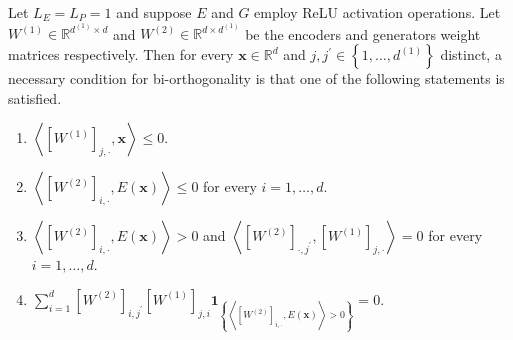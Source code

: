 \begin{corollary}
    Let $L_E=L_P=1$ and suppose $E$ and $G$ employ ReLU activation operations. Let $W^{(1)}\in\mathbb{R}^{d^{(1)}\times d}$ and $W^{(2)}\in\mathbb{R}^{d\times d^{(1)}}$ be the encoders and generators weight matrices respectively. Then for every $\mathbf{x}\in\mathbb{R}^d$ and $j,j^\prime\in\left\{1,\dots,d^{(1)}\right\}$ distinct, a necessary condition for bi-orthogonality is that one of the following statements is satisfied.
    \begin{enumerate}
        \item $\left\langle\left[W^{(1)}\right]_{j,\cdot},\mathbf{x}\right\rangle\leq0$.
        \item $\left\langle\left[W^{(2)}\right]_{i,\cdot},E(\mathbf{x})\right\rangle\leq0$ for every $i=1,\dots,d$.
        \item $\left\langle\left[W^{(2)}\right]_{i,\cdot},E(\mathbf{x})\right\rangle>0$ and $\left\langle\left[W^{(2)}\right]_{\cdot,j^\prime},\left[W^{(1)}\right]_{j,\cdot}\right\rangle=0$ for every $i=1,\dots,d$.
        \item $\sum_{i=1}^d\left[W^{(2)}\right]_{i,j^\prime}\left[W^{(1)}\right]_{j,i}\mathbf{1}_{\left\{\left\langle\left[W^{(2)}\right]_{i,\cdot},E(\mathbf{x})\right\rangle>0\right\}}=0$.
    \end{enumerate}
\end{corollary}

